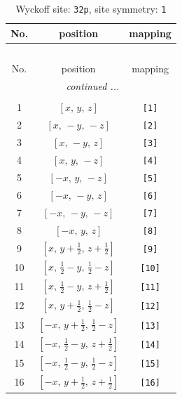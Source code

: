\documentclass[fleqn,8pt]{jsarticle}
\begin{document}
\renewcommand{\arraystretch}{1.2}
\begin{longtable}{ccc}
\caption{Wyckoff site: {\tt 32p}, site symmetry: {\tt 1}}
 \\
 \hline \hline
No. & position & mapping \\ \hline \endfirsthead

\multicolumn{2}{l}{\tablename\ \thetable{}} \\
 \hline \hline
No. & position & mapping \\ \hline \endhead

 \hline \hline
\multicolumn{2}{r}{\footnotesize\it continued ...} \\ \endfoot

 \hline \hline
\multicolumn{2}{r}{} \\ \endlastfoot

1 & $\left[ x,\, y,\, z \right]$ & {\tt [1]} \\ \hline
2 & $\left[ x,\, - y,\, - z \right]$ & {\tt [2]} \\ \hline
3 & $\left[ x,\, - y,\, z \right]$ & {\tt [3]} \\ \hline
4 & $\left[ x,\, y,\, - z \right]$ & {\tt [4]} \\ \hline
5 & $\left[ - x,\, y,\, - z \right]$ & {\tt [5]} \\ \hline
6 & $\left[ - x,\, - y,\, z \right]$ & {\tt [6]} \\ \hline
7 & $\left[ - x,\, - y,\, - z \right]$ & {\tt [7]} \\ \hline
8 & $\left[ - x,\, y,\, z \right]$ & {\tt [8]} \\ \hline
9 & $\left[ x,\, y + \frac{1}{2},\, z + \frac{1}{2} \right]$ & {\tt [9]} \\ \hline
10 & $\left[ x,\, \frac{1}{2} - y,\, \frac{1}{2} - z \right]$ & {\tt [10]} \\ \hline
11 & $\left[ x,\, \frac{1}{2} - y,\, z + \frac{1}{2} \right]$ & {\tt [11]} \\ \hline
12 & $\left[ x,\, y + \frac{1}{2},\, \frac{1}{2} - z \right]$ & {\tt [12]} \\ \hline
13 & $\left[ - x,\, y + \frac{1}{2},\, \frac{1}{2} - z \right]$ & {\tt [13]} \\ \hline
14 & $\left[ - x,\, \frac{1}{2} - y,\, z + \frac{1}{2} \right]$ & {\tt [14]} \\ \hline
15 & $\left[ - x,\, \frac{1}{2} - y,\, \frac{1}{2} - z \right]$ & {\tt [15]} \\ \hline
16 & $\left[ - x,\, y + \frac{1}{2},\, z + \frac{1}{2} \right]$ & {\tt [16]} \\ \hline

\end{longtable}
\end{document}
